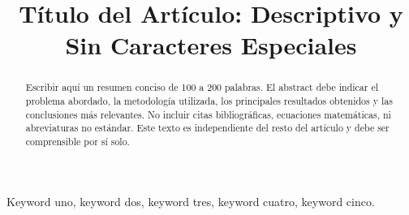\documentclass[conference]{IEEEtran}
\begin{document}
\title{Título del Artículo: Descriptivo y Sin Caracteres Especiales}

\author{
}

\maketitle

\begin{abstract}
  Escribir aquí un resumen conciso de 100 a 200 palabras.
  El abstract debe indicar el problema abordado, la metodología utilizada,
  los principales resultados obtenidos y las conclusiones más relevantes.
  No incluir citas bibliográficas, ecuaciones matemáticas, ni abreviaturas
  no estándar. Este texto es independiente del resto del artículo y debe
  ser comprensible por sí solo.
\end{abstract}

\begin{IEEEkeywords}
  Keyword uno, keyword dos, keyword tres, keyword cuatro, keyword cinco.
\end{IEEEkeywords}

\end{document}
